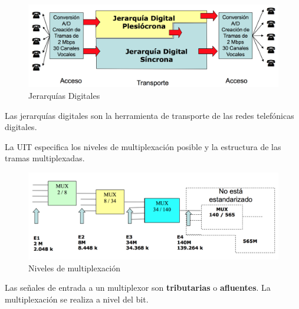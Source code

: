 \documentclass[10pt,portrait, twocolumn]{article}
\makeatletter
\renewcommand{\subsubsection}{\@startsection{subsubsection}{3}{0mm}%
                                {-1ex plus -.5ex minus -.2ex}%
                                {1ex plus .2ex}%
                                {\normalfont\small\bfseries}}
\makeatother
\begin{document}
	\begin{figure}[!ht]
 		\centering
  		 \includegraphics[scale = 0.3]{images/Jerarquia}
		\caption{Jerarquías Digitales}
	\end{figure}

Las jerarquías digitales son la herramienta de transporte de las redes telefónicas digitales.

	
La UIT especifica los niveles de multiplexación posible y la estructura de las tramas multiplexadas.

	
	\begin{figure}[!ht]
 		\centering
  		 \includegraphics[scale = 0.3]{images/NivelesMUX}
		\caption{Niveles de multiplexación}
	\end{figure}

Las señales de entrada a un multiplexor son \textbf{tributarias} o \textbf{afluentes}. La multiplexación se realiza a nivel del bit.

\end{document}
